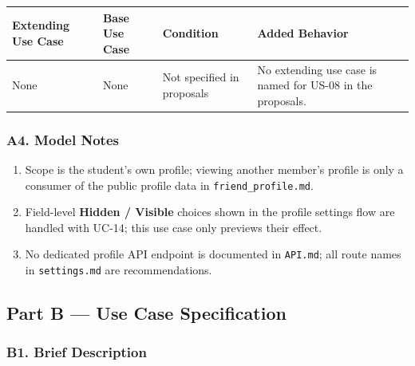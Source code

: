 \documentclass[12pt]{article}
\renewcommand{\baselinestretch}{1.5}
\begin{document}
\begingroup
\small
\renewcommand{\baselinestretch}{1.0}\selectfont
\renewcommand{\arraystretch}{1.15}
\setlength{\tabcolsep}{6pt}
\begin{longtable}{|>{\raggedright\arraybackslash}p{}|>{\raggedright\arraybackslash}p{}|>{\raggedright\arraybackslash}p{}|>{\raggedright\arraybackslash}p{}|}
\hline
\textbf{Extending Use Case} & \textbf{Base Use Case} & \textbf{Condition} & \textbf{Added Behavior} \\ \hline
\endhead
None & None & Not specified in proposals & No extending use case is named for US-08 in the proposals. \\ \hline
\end{longtable}
\endgroup
\par\medskip

\hypertarget{sec:a4-model-notes}{}
\subsubsection*{A4. Model Notes}
\par\medskip

\begin{enumerate}
\item Scope is the student's own profile; viewing another member's profile is only a consumer of the public profile data in \texttt{friend\_profile.md}.
\item Field-level \textbf{Hidden / Visible} choices shown in the profile settings flow are handled with UC-14; this use case only previews their effect.
\item No dedicated profile API endpoint is documented in \texttt{API.md}; all route names in \texttt{settings.md} are recommendations.
\end{enumerate}
\par\medskip

\hypertarget{sec:part-b-use-case-specification}{}
\subsection*{Part B --- Use Case Specification}
\par\medskip

\hypertarget{sec:b1-brief-description}{}
\subsubsection*{B1. Brief Description}
\par\medskip
\end{document}
